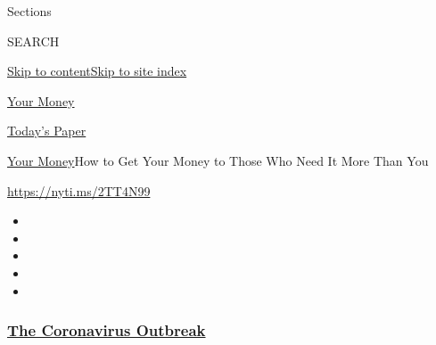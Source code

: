 Sections

SEARCH

\protect\hyperlink{site-content}{Skip to
content}\protect\hyperlink{site-index}{Skip to site index}

\href{https://www.nytimes3xbfgragh.onion/section/your-money}{Your Money}

\href{https://myaccount.nytimes3xbfgragh.onion/auth/login?response_type=cookie\&client_id=vi}{}

\href{https://www.nytimes3xbfgragh.onion/section/todayspaper}{Today's
Paper}

\href{/section/your-money}{Your Money}\textbar{}How to Get Your Money to
Those Who Need It More Than You

\url{https://nyti.ms/2TT4N99}

\begin{itemize}
\item
\item
\item
\item
\item
\end{itemize}

\hypertarget{the-coronavirus-outbreak}{%
\subsubsection{\texorpdfstring{\href{https://www.nytimes3xbfgragh.onion/news-event/coronavirus?name=styln-coronavirus-national\&region=TOP_BANNER\&variant=undefined\&block=storyline_menu_recirc\&action=click\&pgtype=Article\&impression_id=31013260-e3b1-11ea-881f-496d10ec9bb8}{The
Coronavirus
Outbreak}}{The Coronavirus Outbreak}}\label{the-coronavirus-outbreak}}

